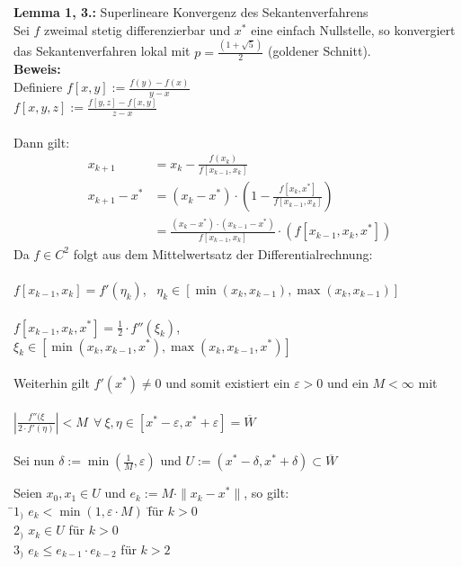 \documentclass[10pt,a4paper]{article}
\begin{document}
\pagebreak
\textbf{Lemma 1, 3.:} Superlineare Konvergenz des Sekantenverfahrens
\\Sei $f$ zweimal stetig differenzierbar und $x^*$ eine einfach Nullstelle, so konvergiert das Sekantenverfahren lokal mit $p=\frac{(1+\sqrt{5})}{2}$ (goldener Schnitt).\\
\newline
\textbf{Beweis:} 
\\Definiere $f[x,y]:=\frac{f(y)-f(x)}{y-x}$\\
\newline
$f[x,y,z]:=\frac{f[y,z]-f[x,y]}{z-x}$\\
\\Dann gilt:
\begin{align*}
x_{k+1}&=x_k-\frac{f(x_k)}{f[x_{k-1},x_k]}
\\x_{k+1}-x^*&=(x_k-x^*)\cdot (1-\frac{f[x_k,x^*]}{f[x_{k-1},x_k]})
\\&=\frac{(x_k-x^*)\cdot(x_{k-1}-x^*)}{f[x_{k-1},x_k]}\cdot (f[x_{k-1},x_k,x^*])
\end{align*}
Da $f\in C^2$ folgt aus dem Mittelwertsatz der Differentialrechnung:\\
\\$f[x_{k-1},x_k]=f'(\eta_k)$, \ $\eta_k\in [\min(x_k,x_{k-1}), \max(x_k,x_{k-1})]$\\
\\$f[x_{k-1},x_k,x^*]=\frac{1}{2}\cdot f''(\xi_k)$, \ $\xi_k\in [\min(x_k,x_{k-1},x^*), \max(x_k,x_{k-1},x^*)]$\\
\\Weiterhin gilt $f'(x^*)\neq 0$ und somit existiert ein $\varepsilon > 0$ und ein $M<\infty$ mit\\
\\ $\left| \frac{f''(\xi}{2\cdot f'(\eta)} \right|<M \ \ \forall \ \xi,\eta\in [x^*-\varepsilon,x^*+\varepsilon]=\overline{W}$\\
\\Sei nun $\delta:= \min (\frac{1}{M},\varepsilon)$ und $U:=(x^*-\delta,x^*+\delta)\subset \overline{W}$
\begin{tabbing}
Seien $x_0, x_1\in U$ und $e_k:=M\cdot \|x_k-x^*\|$, so gilt:
\\\hspace*{8mm} \=$1_)$ $e_k< \min(1,\varepsilon \cdot M)$ \= für $k>0$\\
\>$2_)$ $x_k\in U$\> für $k>0$\\
\>$3_)$ $e_k\leq e_{k-1}\cdot e_{k-2}$\> für $k>2$ \\
\end{tabbing}
\end{document}
